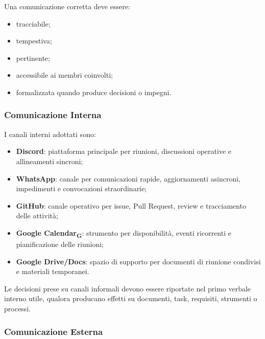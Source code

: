 Una comunicazione corretta deve essere:

\begin{itemize}
    \item tracciabile;
    \item tempestiva;
    \item pertinente;
    \item accessibile ai membri coinvolti;
    \item formalizzata quando produce decisioni o impegni.
\end{itemize}


\subsubsection{Comunicazione Interna}

I canali interni adottati sono:

\begin{itemize}
    \item \textbf{Discord}: piattaforma principale per riunioni, discussioni operative
    e allineamenti sincroni;

    \item \textbf{WhatsApp}: canale per comunicazioni rapide, aggiornamenti asincroni,
    impedimenti e convocazioni straordinarie;

    \item \textbf{GitHub}: canale operativo per issue, Pull Request, review e
    tracciamento delle attività;

    \item \textbf{Google Calendar\textsubscript{G}}: strumento per disponibilità, eventi ricorrenti e
    pianificazione delle riunioni;

    \item \textbf{Google Drive/Docs}: spazio di supporto per documenti di riunione
    condivisi e materiali temporanei.
\end{itemize}

Le decisioni prese su canali informali devono essere riportate nel primo verbale
interno utile, qualora producano effetti su documenti, task, requisiti, strumenti
o processi.


\subsubsection{Comunicazione Esterna}

